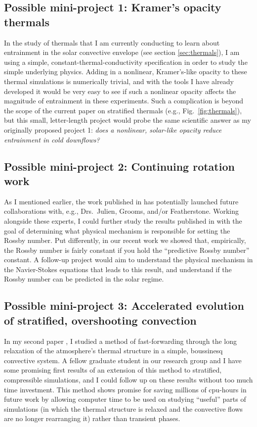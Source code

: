 \documentclass[aasms,12pt]{article}
\begin{document}
\subsection{Possible mini-project 1: Kramer's opacity thermals}
In the study of thermals that I am currently conducting to learn about entrainment in the
solar convective envelope (see section \ref{sec:thermals}), I am using a simple,
constant-thermal-conductivity specification in order to study the simple underlying physics.
Adding in a nonlinear, Kramer's-like opacity to these thermal simulations is numerically
trivial, and
with the tools I have already developed it would be very easy to see if such a nonlinear
opacity affects the magnitude of entrainment in these experiments. Such a
complication is beyond the scope of the current paper on stratified thermals 
(e.g., Fig.~\ref{fig:thermals}), but this
small, letter-length project would probe the same scientific answer as my originally proposed
project 1: \emph{does a nonlinear, solar-like opacity reduce entrainment in cold downflows?}

\subsection{Possible mini-project 2: Continuing rotation work}
\label{sec:future_rotation}
As I mentioned earlier, the work published in \citet{anders&all2019} has potentially
launched future collaborations with, e.g., Drs.~Julien, Grooms, and/or Featherstone.
Working alongside these experts, I could further study the results published in
\citet{anders&all2019} with the goal of determining what physical mechanism is
responsible for setting the Rossby number. Put differently, in our recent work we showed
that, empirically, the Rossby number is fairly constant if you hold the ``predictive
Rossby number'' constant. A follow-up project would aim to
understand the physical mechanism in the Navier-Stokes equations that leads to this
result, and understand if the Rossby number can be predicted in the solar regime.

\subsection{Possible mini-project 3: Accelerated evolution of stratified, overshooting convection}
In my second paper \citep{anders&all2018}, I studied a method of fast-forwarding through the long relaxation of the
atmosphere's thermal structure in a simple, boussinesq convective system. A fellow graduate student
in our research group and I have some promising first results of an extension of this method
to stratified, compressible simulations, and I could follow up on these results without
too much time investment. This method shows promise for saving millions 
of cpu-hours in future work by allowing computer time to be used on studying
``useful'' parts of simulations (in which the thermal structure is relaxed and the convective
flows are no longer rearranging it) rather than transient phases. 



\end{document}
